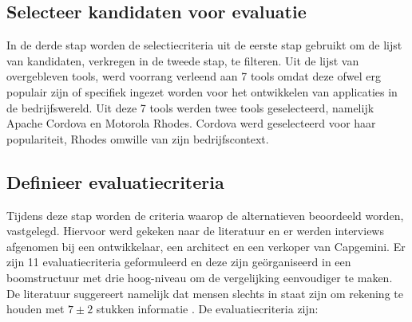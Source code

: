 \documentclass[a4paper]{IEEEconf}
\begin{document}
\subsection{Selecteer kandidaten voor evaluatie}

In de derde stap worden de selectiecriteria uit de eerste stap gebruikt om de lijst van kandidaten, verkregen in de tweede stap, te filteren. Uit de lijst van overgebleven tools, werd voorrang verleend aan 7 tools omdat deze ofwel erg populair zijn of specifiek ingezet worden voor het ontwikkelen van applicaties in de bedrijfswereld. Uit deze 7 tools werden twee tools geselecteerd, namelijk Apache Cordova en Motorola Rhodes. Cordova werd geselecteerd voor haar populariteit, Rhodes omwille van zijn bedrijfscontext.

\subsection{Definieer evaluatiecriteria}

Tijdens deze stap worden de criteria waarop de alternatieven beoordeeld worden, vastgelegd. Hiervoor werd gekeken naar de literatuur \cite{Gartner:CPT:2011, VMCPT:2012} en er werden interviews afgenomen bij een ontwikkelaar, een architect en een verkoper van Capgemini. Er zijn 11 evaluatiecriteria geformuleerd en deze zijn ge\"organiseerd in een boomstructuur met drie hoog-niveau om de vergelijking eenvoudiger te maken. De literatuur suggereert namelijk dat mensen slechts in staat zijn om rekening te houden met $7 \pm 2$ stukken informatie \cite{Miller:1956}. De evaluatiecriteria zijn:
\end{document}
